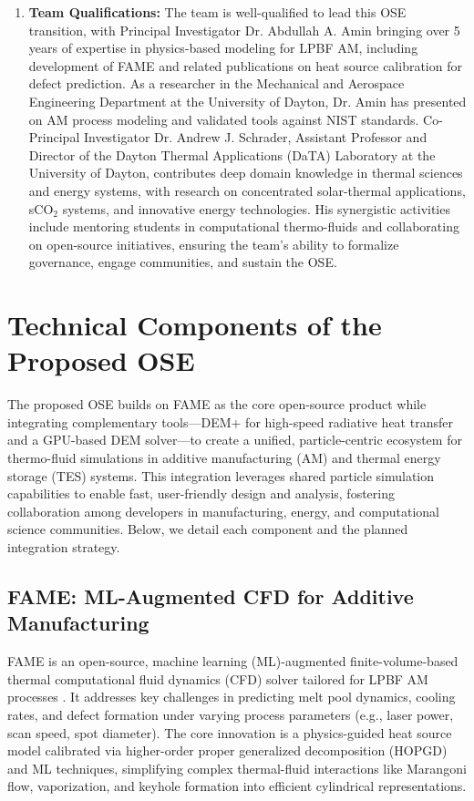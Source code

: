 \documentclass[11pt]{article}
\begin{document}
\begin{enumerate}
    \vspace{-3pt}
    \item \textbf{Team Qualifications:} The team is well-qualified to lead this OSE transition, with Principal Investigator Dr. Abdullah A. Amin bringing over 5 years of expertise in physics-based modeling for LPBF AM, including development of FAME and related publications on heat source calibration for defect prediction. As a researcher in the Mechanical and Aerospace Engineering Department at the University of Dayton, Dr. Amin has presented on AM process modeling  and validated tools against NIST standards. Co-Principal Investigator Dr. Andrew J. Schrader, Assistant Professor and Director of the Dayton Thermal Applications (DaTA) Laboratory at the University of Dayton, contributes deep domain knowledge in thermal sciences and energy systems, with research on concentrated solar-thermal applications, sCO$_2$ systems, and innovative energy technologies. His synergistic activities include mentoring students in computational thermo-fluids and collaborating on open-source initiatives, ensuring the team's ability to formalize governance, engage communities, and sustain the OSE.
\end{enumerate}
\vspace{-3pt}
\section*{Technical Components of the Proposed OSE}
\vspace{-3pt}
\noindent
The proposed OSE builds on FAME as the core open-source product while integrating complementary tools—DEM+ for high-speed radiative heat transfer and a GPU-based DEM solver—to create a unified, particle-centric ecosystem for thermo-fluid simulations in additive manufacturing (AM) and thermal energy storage (TES) systems. This integration leverages shared particle simulation capabilities to enable fast, user-friendly design and analysis, fostering collaboration among developers in manufacturing, energy, and computational science communities. Below, we detail each component and the planned integration strategy.

\subsection*{FAME: ML-Augmented CFD for Additive Manufacturing}
\noindent
FAME is an open-source, machine learning (ML)-augmented finite-volume-based thermal computational fluid dynamics (CFD) solver tailored for LPBF AM processes \cite{aminPhysicsGuidedHeat2024}. It addresses key challenges in predicting melt pool dynamics, cooling rates, and defect formation under varying process parameters (e.g., laser power, scan speed, spot diameter). The core innovation is a physics-guided heat source model calibrated via higher-order proper generalized decomposition (HOPGD) and ML techniques, simplifying complex thermal-fluid interactions like Marangoni flow, vaporization, and keyhole formation into efficient cylindrical representations.
\end{document}
